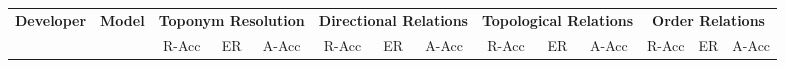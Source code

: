 \begin{table*}[ht]
    \centering
    \begin{tabular}{r|lccc|ccc|ccc|ccc}
    \hline
    \hline
        \multicolumn{1}{r}{\multirow{2}{*}{\textbf{Developer}}} &
        \multicolumn{1}{|l}{\multirow{2}{*}{\textbf{Model}}} &

        \multicolumn{3}{c}{\textbf{Toponym Resolution}} & 
        \multicolumn{3}{|c}{\textbf{Directional Relations}} & 
        \multicolumn{3}{|c}{\textbf{Topological Relations}} & 
        \multicolumn{3}{|c}{\textbf{Order Relations}}  \\
        ~ & ~ & R-Acc & ER & A-Acc & R-Acc & ER & A-Acc & R-Acc & ER & A-Acc & R-Acc & ER & A-Acc \\
        

\end{tabular}
\end{table*}
